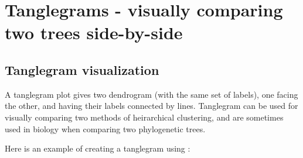 \documentclass[shortnames,nojss,article]{jss}\usepackage[]{graphicx}\usepackage[]{color}
\begin{document}
\section{Tanglegrams - visually comparing two trees side-by-side}

\subsection{Tanglegram visualization}

A tanglegram plot gives two dendrogram (with the same set of labels), one facing the other, and having their labels connected by lines. Tanglegram can be used for visually comparing two methods of heirarchical clustering, and are sometimes used in biology when comparing two phylogenetic trees.


Here is an example of creating a tanglegram using :
\end{document}
